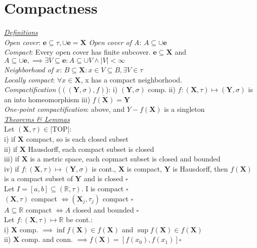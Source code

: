 \section{Compactness}
\underline{\emph{Definitions}}\\
\emph{Open cover}: $\mathbf{e}\subseteq\tau,\cup\mathbf{e}=\mathbf{X}$
\emph{Open cover of A}:
$A\subseteq\cup\mathbf{e}$\\
\emph{Compact}:
Every open cover has finite subcover. $\mathbf{e}\subseteq\mathbf{X}$ and $A\subseteq\cup\mathbf{e},\implies\exists V\subseteq\mathbf{e}:A\subseteq\cup V \land |V|<\infty$\\
\emph{Neighborhood of $x$}: $B\subseteq\mathbf{X}:x\in V\subseteq B,\exists V\in\tau$\\
\emph{Locally compact}: $\forall x\in\mathbf{X}$, x has a compact neighborhood.\\
\emph{Compactification} ($((\mathbf{Y},\sigma), f)$): i) $(\mathbf{Y},\sigma)$ comp. ii) $f:(\mathbf{X},\tau)\mapsto(\mathbf{Y},\sigma)$ is an into homeomorphism iii) $\overline{f(\mathbf{X})}=\mathbf{Y}$\\
\emph{One-point compactification}: above, and $Y-f(\mathbf{X})$ is a singleton
\\\underline{\emph{Theorems \& Lemmas}}\\
Let $(\mathbf{X},\tau)\in$|TOP|: \\
i) if $\mathbf{X}$ compact, so is each closed subset\\
ii) if $\mathbf{X}$ Hausdorff, each compact subset is closed\\
iii) if $\mathbf{X}$ is a metric space, each copmact subset is closed and bounded\\
iv) if $f:(\mathbf{X},\tau)\mapsto(\mathbf{Y},\sigma)$ is cont., $\mathbf{X}$ is compact, $\mathbf{Y}$ is Hausdorff, then $f(\mathbf{X})$ is a compact subset of $\mathbf{Y}$ and is closed $\square$\\
Let $I=[a,b]\subseteq(\mathbb{R},\tau)$. I is compact $\square$\\
$(\mathbf{X},\tau)$ compact $\iff(\mathbf{X}_j,\tau_j)$ compact $\square$\\
$A\subseteq\mathbb{R}$ compact $\iff A$ closed and bounded $\square$\\
Let $f:(\mathbf{X},\tau)\mapsto\mathbb{R}$ be cont.:\\
i) $\mathbf{X}$ comp. $\implies\inf f(\mathbf{X})\in f(\mathbf{X})$ and $\sup f(\mathbf{X})\in f(\mathbf{X})$\\
ii) $\mathbf{X}$ comp. and conn. $\implies f(\mathbf{X})=[f(x_0),f(x_1)]\square$\\
